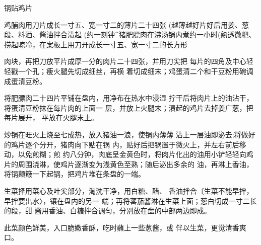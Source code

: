 \begin{recipe}{锅贴鸡片}

\ingredients


\cooking

\step 鸡脯肉用刀片成长一寸五、宽一寸二的薄片二十四张 (越薄越好片好后用姜、葱段、料酒、酱油拌合渍起 (约一刻钟^猪肥膘肉在沸汤锅内煮约一小时(熟透微粑、 捞起晾冷，在案板上用刀开成长一寸五、宽一寸二的长方形

肉块，再把刀放平片成厚一分的肉片二十四张，并用刀尖把 每片的四角及中心轻轻戳一个孔；瘦火腿先切成细丝，再横 着切成细末；鸡蛋清二个和干豆粉用碗调成蛋清豆粉。

\step 	将肥膘肉二十四片平铺在盘内，用净布在热水中浸湿 拧干后将肉片上的油沾干，将蛋清豆粉抹在每片肉的上面一 层，并放上火腿末；渍起的鸡片去掉姜广葱，把每片展开， 平放在火腿末上。

\step 	炒锅在旺火上烧至七成热，放入猪油一浪，使锅内薄薄 沾上一层油即泌去;将做好的鸡片逐个分开，猪肉向下贴在锅 内，贴好后把锅置于微火上，并左右前后移动，以免煎糊；煎 约八分钟，肉底呈金黄色时，将肉片化出的油用小铲轻轻向鸡 片的周围浇淋，使鸡片逐渐变为浅黄色至熟；随后泌出多余的 油，再淋上香油，将锅颠簸一下起锅，把鸡片堆在条盘的一端。

\step 生菜择用菜心及叶尖部分，淘洗干净，用白糖、醋、 香油拌合〔生菜不能早拌，早拌要出水〉，镶在盘内的另一 端；再将蕃茄酱淋在生菜上面；葱白切成一寸二长的段，甜 酱用香油、白糖拌合调匀，分别放在盘的中部两边即成。

\notes

此菜颜色鲜美，入口脆嫩香酥，吃时蘸上一些葱酱，或 伴以生菜，更觉清香爽口。

\end{recipe}

